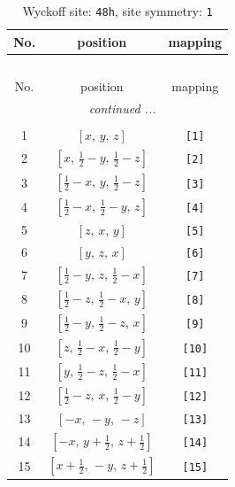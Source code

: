 \documentclass[fleqn,8pt]{jsarticle}
\begin{document}
\renewcommand{\arraystretch}{1.2}
\begin{longtable}{ccc}
\caption{Wyckoff site: {\tt 48h}, site symmetry: {\tt 1}}
 \\
 \hline \hline
No. & position & mapping \\ \hline \endfirsthead

\multicolumn{2}{l}{\tablename\ \thetable{}} \\
 \hline \hline
No. & position & mapping \\ \hline \endhead

 \hline \hline
\multicolumn{2}{r}{\footnotesize\it continued ...} \\ \endfoot

 \hline \hline
\multicolumn{2}{r}{} \\ \endlastfoot

1 & $\left[ x,\, y,\, z \right]$ & {\tt [1]} \\ \hline
2 & $\left[ x,\, \frac{1}{2} - y,\, \frac{1}{2} - z \right]$ & {\tt [2]} \\ \hline
3 & $\left[ \frac{1}{2} - x,\, y,\, \frac{1}{2} - z \right]$ & {\tt [3]} \\ \hline
4 & $\left[ \frac{1}{2} - x,\, \frac{1}{2} - y,\, z \right]$ & {\tt [4]} \\ \hline
5 & $\left[ z,\, x,\, y \right]$ & {\tt [5]} \\ \hline
6 & $\left[ y,\, z,\, x \right]$ & {\tt [6]} \\ \hline
7 & $\left[ \frac{1}{2} - y,\, z,\, \frac{1}{2} - x \right]$ & {\tt [7]} \\ \hline
8 & $\left[ \frac{1}{2} - z,\, \frac{1}{2} - x,\, y \right]$ & {\tt [8]} \\ \hline
9 & $\left[ \frac{1}{2} - y,\, \frac{1}{2} - z,\, x \right]$ & {\tt [9]} \\ \hline
10 & $\left[ z,\, \frac{1}{2} - x,\, \frac{1}{2} - y \right]$ & {\tt [10]} \\ \hline
11 & $\left[ y,\, \frac{1}{2} - z,\, \frac{1}{2} - x \right]$ & {\tt [11]} \\ \hline
12 & $\left[ \frac{1}{2} - z,\, x,\, \frac{1}{2} - y \right]$ & {\tt [12]} \\ \hline
13 & $\left[ - x,\, - y,\, - z \right]$ & {\tt [13]} \\ \hline
14 & $\left[ - x,\, y + \frac{1}{2},\, z + \frac{1}{2} \right]$ & {\tt [14]} \\ \hline
15 & $\left[ x + \frac{1}{2},\, - y,\, z + \frac{1}{2} \right]$ & {\tt [15]} \\ \hline

\end{longtable}
\end{document}
